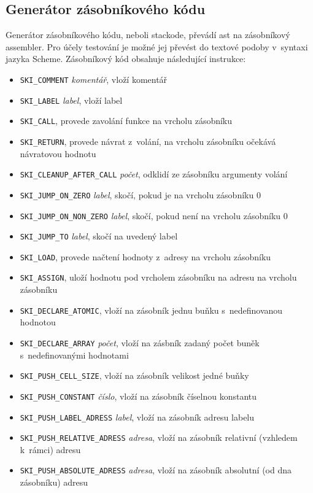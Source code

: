 \documentclass[a4paper,10pt]{article}
\begin{document}
\subsection{Generátor zásobníkového kódu}
Generátor zásobníkového kódu, neboli stackode, převádí ast na zásobníkový assembler. Pro účely testování je možné jej převést do textové podoby v~syntaxi jazyka Scheme. Zásobníkový kód obsahuje následující instrukce:
\begin{itemize}
	\item \verb|SKI_COMMENT| \textit{komentář}, vloží komentář
	\item \verb|SKI_LABEL| \textit{label}, vloží label

	\item \verb|SKI_CALL|, provede zavolání funkce na vrcholu zásobníku
	\item \verb|SKI_RETURN|, provede návrat z~volání, na vrcholu zásobníku očekává návratovou hodnotu 
	\item \verb|SKI_CLEANUP_AFTER_CALL| \textit{počet}, odklidí ze zásobníku argumenty volání
	\item \verb|SKI_JUMP_ON_ZERO| \textit{label}, skočí, pokud je na vrcholu zásobníku $0$ 
	\item \verb|SKI_JUMP_ON_NON_ZERO| \textit{label}, skočí, pokud není na vrcholu zásobníku $0$
	\item \verb|SKI_JUMP_TO| \textit{label}, skočí na uvedený label 

	\item \verb|SKI_LOAD|, provede načtení hodnoty z~adresy na vrcholu zásobníku
	\item \verb|SKI_ASSIGN|, uloží hodnotu pod vrcholem zásobníku na adresu na vrcholu zásobníku
	\item \verb|SKI_DECLARE_ATOMIC|, vloží na zásobník jednu buňku s~nedefinovanou hodnotou 
	\item \verb|SKI_DECLARE_ARRAY| \textit{počet}, vloží na zásbník zadaný počet buněk s~nedefinovanými hodnotami 

	\item \verb|SKI_PUSH_CELL_SIZE|, vloží na zásobník velikost jedné buňky
	\item \verb|SKI_PUSH_CONSTANT| \textit{číslo}, vloží na zásobník číselnou konstantu 
	\item \verb|SKI_PUSH_LABEL_ADRESS| \textit{label}, vloží na zásobník adresu labelu 
	\item \verb|SKI_PUSH_RELATIVE_ADRESS| \textit{adresa}, vloží na zásobník relativní (vzhledem k~rámci) adresu 
	\item \verb|SKI_PUSH_ABSOLUTE_ADRESS| \textit{adresa}, vloží na zásobník absolutní (od dna zásobníku) adresu


\end{itemize}
\end{document}

